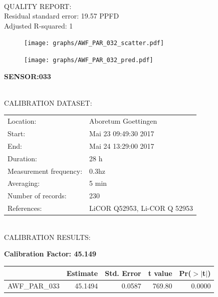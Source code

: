 \documentclass[oneside]{report}
\begin{document}
\hrulefill\\
QUALITY REPORT:\\
Residual standard error: 19.57 PPFD\\
Adjusted R-squared: 1



\begin{figure}[H]
  \centering
  \texttt{[image: graphs/AWF\_PAR\_032\_scatter.pdf]}
\end{figure}




\begin{figure}[H]
  \centering
  \texttt{[image: graphs/AWF\_PAR\_032\_pred.pdf]}
\end{figure}

\pagebreak


\begin{center}
\large{\textbf{SENSOR:033}}\\
\end{center}

\hrulefill\\
CALIBRATION DATASET:\\
\begin{table}[h!]
  \centering
  \label{tab:table1}
  \begin{tabular}{ll}
    Location: & Aboretum Goettingen\\ 
    
    
    Start:  & Mai 23 09:49:30 2017 \\
    End:   & Mai 24 13:29:00 2017\\ 
    Duration: & 28 h\\
    Measurement frequency: & 0.3hz\\
    Averaging:  &5 min\\
    Number of records: & 230 \\
    References: & LiCOR Q52953, Li-COR Q 52953 \\
  \end{tabular}
\end{table}

\hrulefill\\
CALIBRATION RESULTS:\\


\begin{center}
\textbf{\large{Calibration Factor: 45.149}}\\
\end{center}
\begin{table}[ht]
\centering
\begin{tabular}{rrrrr}
  \hline
 & Estimate & Std. Error & t value & Pr($>$$|$t$|$) \\ 
  \hline
AWF\_PAR\_033 & 45.1494 & 0.0587 & 769.80 & 0.0000 \\ 
   \hline
\end{tabular}
\end{table}
\end{document}
